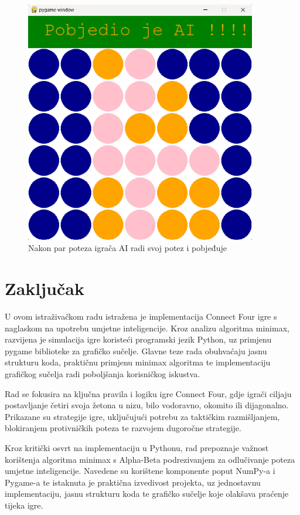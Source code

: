 \documentclass[]{foi}
\begin{document}
\begin{figure}[]
    \centering
    \includegraphics[width=0.9\textwidth]{slike/4.png}
    \caption{Nakon par poteza igrača AI radi svoj potez i pobjeđuje}
    \label{Slika1}
\end{figure}

\chapter{Zaključak}

U ovom istraživačkom radu istražena je implementacija Connect Four igre s naglaskom na upotrebu umjetne inteligencije. Kroz analizu algoritma minimax, razvijena je simulacija igre koristeći programski jezik Python, uz primjenu pygame biblioteke za grafičko sučelje. Glavne teze rada obuhvaćaju jasnu strukturu koda, praktičnu primjenu minimax algoritma te implementaciju grafičkog sučelja radi poboljšanja korisničkog iskustva.

Rad se fokusira na ključna pravila i logiku igre Connect Four, gdje igrači ciljaju postavljanje četiri svoja žetona u nizu, bilo vodoravno, okomito ili dijagonalno. Prikazane su strategije igre, uključujući potrebu za taktičkim razmišljanjem, blokiranjem protivničkih poteza te razvojem dugoročne strategije.

Kroz kritički osvrt na implementaciju u Pythonu, rad prepoznaje važnost korištenja algoritma minimax s Alpha-Beta podrezivanjem za odlučivanje poteza umjetne inteligencije. Navedene su korištene komponente poput NumPy-a i Pygame-a te istaknuta je praktična izvedivost projekta, uz jednostavnu implementaciju, jasnu strukturu koda te grafičko sučelje koje olakšava praćenje tijeka igre.
\end{document}
